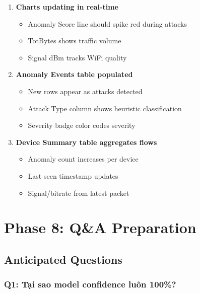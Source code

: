 \documentclass[12pt,a4paper]{article}
\begin{document}
\begin{enumerate}
    \item \textbf{Charts updating in real-time}
        \begin{itemize}
            \item Anomaly Score line should spike red during attacks
            \item TotBytes shows traffic volume
            \item Signal dBm tracks WiFi quality
        \end{itemize}
    
    \item \textbf{Anomaly Events table populated}
        \begin{itemize}
            \item New rows appear as attacks detected
            \item Attack Type column shows heuristic classification
            \item Severity badge color codes severity
        \end{itemize}
    
    \item \textbf{Device Summary table aggregates flows}
        \begin{itemize}
            \item Anomaly count increases per device
            \item Last seen timestamp updates
            \item Signal/bitrate from latest packet
        \end{itemize}
\end{enumerate}

\section{Phase 8: Q\&A Preparation}

\subsection{Anticipated Questions}

\subsubsection{Q1: Tại sao model confidence luôn 100\%?}
\end{document}
